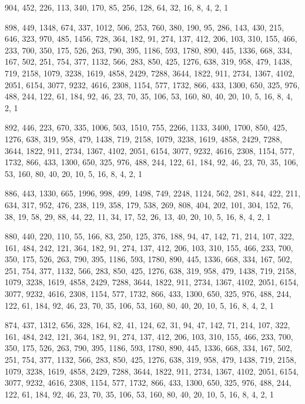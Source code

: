 \documentclass[12pt]{article}
\begin{document}
904, 452, 226, 113, 340, 170, 85, 256, 128, 64, 32, 16, 8, 4, 2, 1

898, 449, 1348, 674, 337, 1012, 506, 253, 760, 380, 190, 95, 286, 143, 430, 215, 646, 323, 970, 485, 1456, 728, 364, 182, 91, 274, 137, 412, 206, 103, 310, 155, 466, 233, 700, 350, 175, 526, 263, 790, 395, 1186, 593, 1780, 890, 445, 1336, 668, 334, 167, 502, 251, 754, 377, 1132, 566, 283, 850, 425, 1276, 638, 319, 958, 479, 1438, 719, 2158, 1079, 3238, 1619, 4858, 2429, 7288, 3644, 1822, 911, 2734, 1367, 4102, 2051, 6154, 3077, 9232, 4616, 2308, 1154, 577, 1732, 866, 433, 1300, 650, 325, 976, 488, 244, 122, 61, 184, 92, 46, 23, 70, 35, 106, 53, 160, 80, 40, 20, 10, 5, 16, 8, 4, 2, 1

892, 446, 223, 670, 335, 1006, 503, 1510, 755, 2266, 1133, 3400, 1700, 850, 425, 1276, 638, 319, 958, 479, 1438, 719, 2158, 1079, 3238, 1619, 4858, 2429, 7288, 3644, 1822, 911, 2734, 1367, 4102, 2051, 6154, 3077, 9232, 4616, 2308, 1154, 577, 1732, 866, 433, 1300, 650, 325, 976, 488, 244, 122, 61, 184, 92, 46, 23, 70, 35, 106, 53, 160, 80, 40, 20, 10, 5, 16, 8, 4, 2, 1

886, 443, 1330, 665, 1996, 998, 499, 1498, 749, 2248, 1124, 562, 281, 844, 422, 211, 634, 317, 952, 476, 238, 119, 358, 179, 538, 269, 808, 404, 202, 101, 304, 152, 76, 38, 19, 58, 29, 88, 44, 22, 11, 34, 17, 52, 26, 13, 40, 20, 10, 5, 16, 8, 4, 2, 1

880, 440, 220, 110, 55, 166, 83, 250, 125, 376, 188, 94, 47, 142, 71, 214, 107, 322, 161, 484, 242, 121, 364, 182, 91, 274, 137, 412, 206, 103, 310, 155, 466, 233, 700, 350, 175, 526, 263, 790, 395, 1186, 593, 1780, 890, 445, 1336, 668, 334, 167, 502, 251, 754, 377, 1132, 566, 283, 850, 425, 1276, 638, 319, 958, 479, 1438, 719, 2158, 1079, 3238, 1619, 4858, 2429, 7288, 3644, 1822, 911, 2734, 1367, 4102, 2051, 6154, 3077, 9232, 4616, 2308, 1154, 577, 1732, 866, 433, 1300, 650, 325, 976, 488, 244, 122, 61, 184, 92, 46, 23, 70, 35, 106, 53, 160, 80, 40, 20, 10, 5, 16, 8, 4, 2, 1

874, 437, 1312, 656, 328, 164, 82, 41, 124, 62, 31, 94, 47, 142, 71, 214, 107, 322, 161, 484, 242, 121, 364, 182, 91, 274, 137, 412, 206, 103, 310, 155, 466, 233, 700, 350, 175, 526, 263, 790, 395, 1186, 593, 1780, 890, 445, 1336, 668, 334, 167, 502, 251, 754, 377, 1132, 566, 283, 850, 425, 1276, 638, 319, 958, 479, 1438, 719, 2158, 1079, 3238, 1619, 4858, 2429, 7288, 3644, 1822, 911, 2734, 1367, 4102, 2051, 6154, 3077, 9232, 4616, 2308, 1154, 577, 1732, 866, 433, 1300, 650, 325, 976, 488, 244, 122, 61, 184, 92, 46, 23, 70, 35, 106, 53, 160, 80, 40, 20, 10, 5, 16, 8, 4, 2, 1
\end{document}
